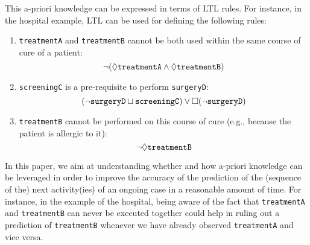 This a-priori knowledge can be expressed in terms of LTL rules. For instance, in the hospital example, LTL can be used for defining the following rules:
\begin{enumerate}[1)]
\item \texttt{treatmentA} and \texttt{treatmentB} cannot be both used within the same course of cure of a patient:
  \begin{equation}
    \label{eq:LTL1}
    \neg(\lozenge \mathtt{treatmentA} \wedge \lozenge \mathtt{treatmentB})
  \end{equation}
\item \texttt{screeningC} is a pre-requisite to perform \texttt{surgeryD}:
  \begin{equation}
    \label{eq:LTL2}
    (\neg \mathtt{surgeryD} \sqcup \mathtt{screeningC}) \vee \square (\neg  \mathtt{surgeryD})
  \end{equation}
\item \texttt{treatmentB} cannot be performed on this course of cure (e.g., because the patient is allergic to it):
\begin{equation}
	\label{eq:LTL3}
	\neg \lozenge \mathtt{treatmentB}
\end{equation}
\end{enumerate}

In this paper, we aim at understanding whether and how a-priori knowledge can be leveraged in order to improve the accuracy of the prediction of the (sequence of the) next activity(ies) of an ongoing case in a reasonable amount of time. For instance, in the example of the hospital, being aware of the fact that \texttt{treatmentA} and \texttt{treatmentB} can never be executed together could help in ruling out a prediction of \texttt{treatmentB} whenever we have already observed \texttt{treatmentA} and vice versa.



